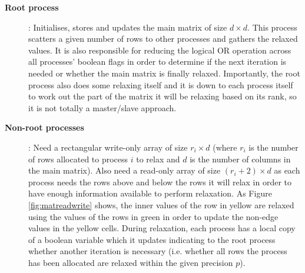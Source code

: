 \documentclass[11pt]{article}
\begin{document}
\begin{description}
\item[\textbf{Root process}]: Initialises, stores and updates the main matrix of size $d \times d$. This process scatters a given number of rows to other processes and gathers the relaxed values. It is also responsible for reducing the logical OR operation across all processes' boolean flags in order to determine if the next iteration is needed or whether the main matrix is finally relaxed. Importantly, the root process also does some relaxing itself and it is down to each process itself to work out the part of the matrix it will be relaxing based on its rank, so it is not totally a master/slave approach.
\item[\textbf{Non-root processes}]:  Need a rectangular write-only array of size $r_i \times d$ (where $r_i$ is the number of rows allocated to process $i$ to relax and $d$ is the number of columns in the main matrix). Also need a read-only array of size $(r_{i}+2) \times d$ as each process needs the rows above and below the rows it will relax in order to have enough information available to perform relaxation. As Figure \ref{fig:matreadwrite} shows, the inner values of the row in yellow are relaxed using the values of the rows in green in order to update the non-edge values in the yellow cells. During relaxation, each process has a local copy of a boolean variable which it updates indicating to the root process whether another iteration is necessary (i.e. whether all rows the process has been allocated are relaxed within the given precision $p$). 
\end{description}
\end{document}
